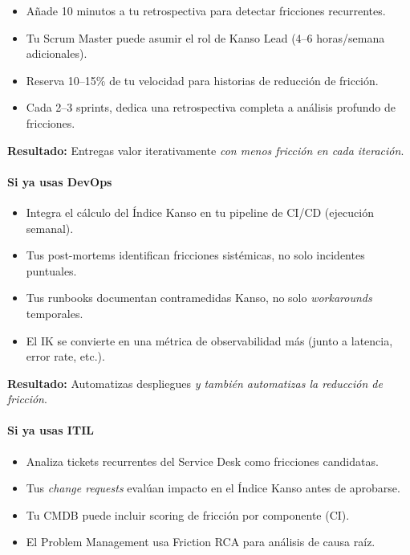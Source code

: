 \begin{itemize}
    \item Añade 10 minutos a tu retrospectiva para detectar fricciones recurrentes.
    \item Tu Scrum Master puede asumir el rol de Kanso Lead (4--6 horas/semana adicionales).
    \item Reserva 10--15\% de tu velocidad para historias de reducción de fricción.
    \item Cada 2--3 sprints, dedica una retrospectiva completa a análisis profundo de fricciones.
\end{itemize}

\textbf{Resultado:} Entregas valor iterativamente \emph{con menos fricción en cada iteración}.

\paragraph{Si ya usas DevOps}

\begin{itemize}
    \item Integra el cálculo del Índice Kanso en tu pipeline de CI/CD (ejecución semanal).
    \item Tus post-mortems identifican fricciones sistémicas, no solo incidentes puntuales.
    \item Tus runbooks documentan contramedidas Kanso, no solo \textit{workarounds} temporales.
    \item El IK se convierte en una métrica de observabilidad más (junto a latencia, error rate, etc.).
\end{itemize}

\textbf{Resultado:} Automatizas despliegues \emph{y también automatizas la reducción de fricción}.

\paragraph{Si ya usas ITIL}

\begin{itemize}
    \item Analiza tickets recurrentes del Service Desk como fricciones candidatas.
    \item Tus \textit{change requests} evalúan impacto en el Índice Kanso antes de aprobarse.
    \item Tu CMDB puede incluir scoring de fricción por componente (CI).
    \item El Problem Management usa Friction RCA para análisis de causa raíz.
\end{itemize}

